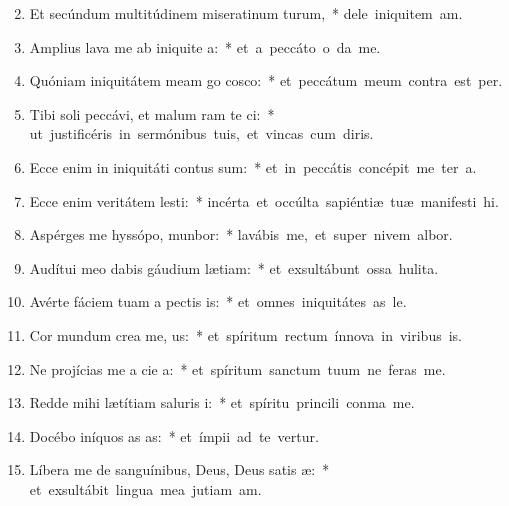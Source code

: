 \begin{flushleft}
\begin{enumerate}[leftmargin=*]
\setcounter{enumi}{1}

\item Et secúndum multitúdinem miseratinum turum,~* \mbox{dele iniquitem am.}
\item Amplius lava me ab iniquite a:~* \mbox{et a peccáto o da me.}
\item Quóniam iniquitátem meam go cosco:~* \mbox{et peccátum meum contra  est per.}
\item Tibi soli peccávi, et malum ram te ci:~* \mbox{ut justificéris in sermónibus tuis, et vincas cum diris.}
\item Ecce enim in iniquitáti contus sum:~* \mbox{et in peccátis concépit me ter a.}
\item Ecce enim veritátem lesti:~* \mbox{incérta et occúlta sapiéntiæ tuæ manifesti hi.}
\item Aspérges me hyssópo,  munbor:~* \mbox{lavábis me, et super nivem albor.}
\item Audítui meo dabis gáudium  lætiam:~* \mbox{et exsultábunt ossa hulita.}
\item Avérte fáciem tuam a pectis is:~* \mbox{et omnes iniquitátes as le.}
\item Cor mundum crea  me, us:~* \mbox{et spíritum rectum ínnova in viribus is.}
\item Ne projícias me a cie a:~* \mbox{et spíritum sanctum tuum ne feras  me.}
\item Redde mihi lætítiam saluris i:~* \mbox{et spíritu princili conma me.}
\item Docébo iníquos as as:~* \mbox{et ímpii ad te vertur.}
\item Líbera me de sanguínibus, Deus, Deus satis æ:~* \mbox{et exsultábit lingua mea jutiam am.}

\end{enumerate}
\end{flushleft}
